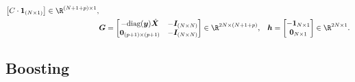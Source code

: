 {\begin{equation}
\begin{aligned}
\begin{bmatrix}
                    C \cdot \bm{1}_{(\ndata \times 1)}
                \end{bmatrix} \in \R^{(\ndata + 1 + \nfeat) \times 1}, \\
                & \bm{G} = \begin{bmatrix}
                    -\text{diag}(\bm{y}) \hat{\bm{X}} & -\bm{I}_{(\ndata \times \ndata)} \\
                    \bm{0}_{(\nfeat + 1) \times (\nfeat + 1)} & -\bm{I}_{(\ndata \times \ndata)}
                \end{bmatrix} \in \R^{2\ndata \times (\ndata + 1 + \nfeat)},
                & \bm{h} = \begin{bmatrix} -\bm{1}_{\ndata \times 1} \\ \bm{0}_{\ndata \times 1} \end{bmatrix}\in \R^{2\ndata \times 1}.
            \end{aligned}
        \end{equation}


        
\subsection{Boosting}
}
